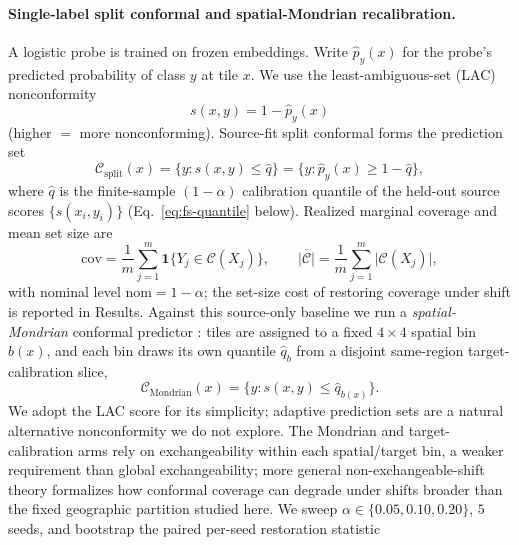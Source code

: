 \documentclass[preprint,11pt,authoryear]{elsarticle}
\begin{document}
\paragraph{Single-label split conformal and spatial-Mondrian recalibration.}
A logistic probe is trained on frozen embeddings. Write $\hat p_y(x)$ for the probe's predicted probability of
class $y$ at tile $x$. We use the least-ambiguous-set (LAC) nonconformity
\citep{sadinle2019lac}
\begin{equation}
\label{eq:lac-score}
s(x,y)=1-\hat p_y(x)
\end{equation}
(higher $=$ more nonconforming). Source-fit split conformal
\citep{vovk2005algorithmic,angelopoulos2023conformal} forms the prediction set
\begin{equation}
\label{eq:split-cp}
\mathcal{C}_{\mathrm{split}}(x)=\bigl\{y:s(x,y)\le\hat q\bigr\}
=\bigl\{y:\hat p_y(x)\ge 1-\hat q\bigr\},
\end{equation}
where $\hat q$ is the finite-sample $(1-\alpha)$ calibration quantile of the held-out source scores
$\{s(x_i,y_i)\}$ (Eq.~\eqref{eq:fs-quantile} below). Realized marginal coverage and mean set size are
\begin{equation}
\label{eq:coverage}
\mathrm{cov}
=\frac{1}{m}\sum_{j=1}^{m}\mathbf{1}\bigl\{Y_j\in\mathcal{C}(X_j)\bigr\},
\qquad
\overline{|\mathcal{C}|}
=\frac{1}{m}\sum_{j=1}^{m}\bigl|\mathcal{C}(X_j)\bigr|,
\end{equation}
with nominal level $\mathrm{nom}=1-\alpha$; the set-size cost of restoring coverage under shift is reported
in Results. Against this source-only baseline we run a
\emph{spatial-Mondrian} conformal predictor \citep{vovk2003mondrian}: tiles are assigned to a fixed
$4{\times}4$ spatial bin $b(x)$, and each bin draws its own quantile $\hat q_{b}$ from a disjoint
same-region target-calibration slice,
\begin{equation}
\label{eq:mondrian}
\mathcal{C}_{\mathrm{Mondrian}}(x)
=\bigl\{y:s(x,y)\le\hat q_{b(x)}\bigr\}.
\end{equation}
We adopt the LAC score for its simplicity; adaptive prediction sets \citep{romano2020classification} are a
natural alternative nonconformity we do not explore. The Mondrian and target-calibration arms rely on
exchangeability within each spatial/target bin, a weaker requirement than global exchangeability; more
general non-exchangeable-shift theory \citep{barber2023conformal} formalizes how conformal coverage can
degrade under shifts broader than the fixed geographic partition studied here. We sweep
$\alpha\in\{0.05,0.10,0.20\}$, $5$ seeds, and bootstrap the paired per-seed restoration statistic
\end{document}
